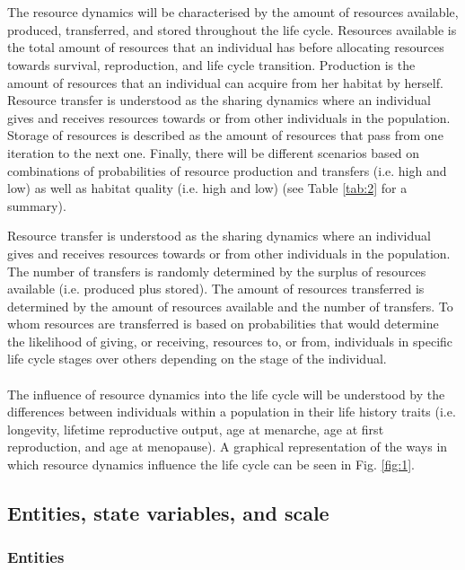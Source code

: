 \documentclass{article}
\begin{document}
\\\\
The resource dynamics will be characterised by the amount of resources available, produced, transferred, and stored throughout the life cycle. Resources available is the total amount of resources that an individual has before allocating resources towards survival, reproduction, and life cycle transition. Production is the amount of resources that an individual can acquire from her habitat by herself. Resource transfer is understood as the sharing dynamics where an individual gives and receives resources towards or from other individuals in the population. Storage of resources is described as the amount of resources that pass from one iteration to the next one. Finally, there will be different scenarios based on combinations of probabilities of resource production and transfers (i.e. high and low) as well as habitat quality (i.e. high and low) (see Table \ref{tab:2} for a summary).

Resource transfer is understood as the sharing dynamics where an individual gives and receives resources towards or from other individuals in the population. The number of transfers is randomly determined by the surplus of resources available (i.e. produced plus stored). The amount of resources transferred is determined by the amount of resources available and the number of transfers. To whom resources are transferred is based on probabilities that would determine the likelihood of giving, or receiving, resources to, or from, individuals in specific life cycle stages over others depending on the stage of the individual. 
\\\\
The influence of resource dynamics into the life cycle will be understood by the differences between individuals within a population in their life history traits (i.e. longevity, lifetime reproductive output, age at menarche, age at first reproduction, and age at menopause). A graphical representation of the ways in which resource dynamics influence the life cycle can be seen in Fig. \ref{fig:1}.

\subsection{Entities, state variables, and scale}

\subsubsection{Entities}
\end{document}
